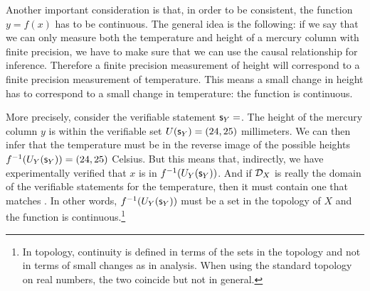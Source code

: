 \documentclass[11pt,letterpaper,fleqn]{memoir} %
\begin{document}
Another important consideration is that, in order to be consistent, the function $y=f(x)$ has to be continuous. The general idea is the following: if we say that we can only measure both the temperature and height of a mercury column with finite precision, we have to make sure that we can use the causal relationship for inference. Therefore a finite precision measurement of height will correspond to a finite precision measurement of temperature. This means a small change in height has to correspond to a small change in temperature: the function is continuous.

More precisely, consider the verifiable statement $\mathsf{s}_Y=$. The height of the mercury column $y$ is within the verifiable set $U(\mathsf{s}_Y) = (24, 25)$ millimeters. We can then infer that the temperature must be in the reverse image of the possible heights $f^{-1}(U_Y(\mathsf{s}_Y))=(24,25)$ Celsius. But this means that, indirectly, we have experimentally verified that $x$ is in $f^{-1}(U_Y(\mathsf{s}_Y))$. And if $\mathcal{D}_X$ is really the domain of the verifiable statements for the temperature, then it must contain one that matches . In other words, $f^{-1}(U_Y(\mathsf{s}_Y))$ must be a set in the topology of $X$ and the function is continuous.\footnote{In topology, continuity is defined in terms of the sets in the topology and not in terms of small changes as in analysis. When using the standard topology on real numbers, the two coincide but not in general.}
\end{document}
